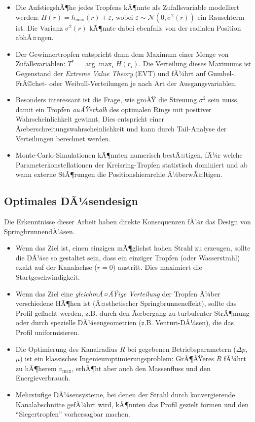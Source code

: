 ﻿\documentclass[a4paper,12pt]{article}
\theoremstyle{definition}
\begin{document}
\begin{itemize}
    \item Die AufstiegshÃ¶he jedes Tropfens kÃ¶nnte als Zufallsvariable modelliert werden:
          $H(r) = h_{\max}(r) + \varepsilon$, wobei $\varepsilon \sim \mathcal{N}(0, \sigma^2(r))$
          ein Rauschterm ist. Die Varianz $\sigma^2(r)$ kÃ¶nnte dabei ebenfalls von der
          radialen Position abhÃ¤ngen.
    \item Der Gewinnertropfen entspricht dann dem Maximum einer Menge von Zufallsvariablen:
          $T^* = \arg\max_i H(r_i)$. Die Verteilung dieses Maximums ist Gegenstand der
          \emph{Extreme Value Theory} (EVT) und fÃ¼hrt auf Gumbel-, FrÃ©chet- oder
          Weibull-Verteilungen je nach Art der Ausgangsvariablen.
    \item Besonders interessant ist die Frage, wie groÃŸ die Streuung $\sigma^2$ sein muss,
          damit ein Tropfen \emph{auÃŸerhalb} des optimalen Rings mit positiver Wahrscheinlichkeit
          gewinnt. Dies entspricht einer Ãœberschreitungswahrscheinlichkeit und kann durch
          Tail-Analyse der Verteilungen berechnet werden.
    \item Monte-Carlo-Simulationen kÃ¶nnten numerisch bestÃ¤tigen, fÃ¼r welche Parameterkonstellationen
          der Kreisring-Tropfen statistisch dominiert und ab wann externe StÃ¶rungen die
          Positionshierarchie Ã¼berwÃ¤ltigen.
\end{itemize}

\subsection{Optimales DÃ¼sendesign}

Die Erkenntnisse dieser Arbeit haben direkte Konsequenzen fÃ¼r das Design von Springbrunnen\-dÃ¼sen.

\begin{itemize}
    \item Wenn das Ziel ist, einen einzigen mÃ¶glichst hohen Strahl zu erzeugen, sollte
          die DÃ¼se so gestaltet sein, dass ein einziger Tropfen (oder Wasserstrahl) exakt auf
          der Kanalachse ($r = 0$) austritt. Dies maximiert die Startgeschwindigkeit.
    \item Wenn das Ziel eine \emph{gleichmÃ¤ÃŸige Verteilung} der Tropfen Ã¼ber verschiedene
          HÃ¶hen ist (Ã¤sthetischer Springbrunneneffekt), sollte das Profil geflacht werden,
          z.B. durch den Ãœbergang zu turbulenter StrÃ¶mung oder durch spezielle DÃ¼sengeometrien
          (z.B. Venturi-DÃ¼sen), die das Profil uniformisieren.
    \item Die Optimierung des Kanalradius $R$ bei gegebenen Betriebsparametern
          ($\Delta p$, $\mu$) ist ein klassisches Ingenieuroptimierungsproblem:
          GrÃ¶ÃŸeres $R$ fÃ¼hrt zu hÃ¶herem $v_{\max}$, erhÃ¶ht aber auch den Massenfluss und
          den Energieverbrauch.
    \item Mehrstufige DÃ¼sensysteme, bei denen der Strahl durch konvergierende Kanalabschnitte
          gefÃ¼hrt wird, kÃ¶nnten das Profil gezielt formen und den ``Siegertropfen'' vorhersagbar
          machen.
\end{itemize}
\end{document}
